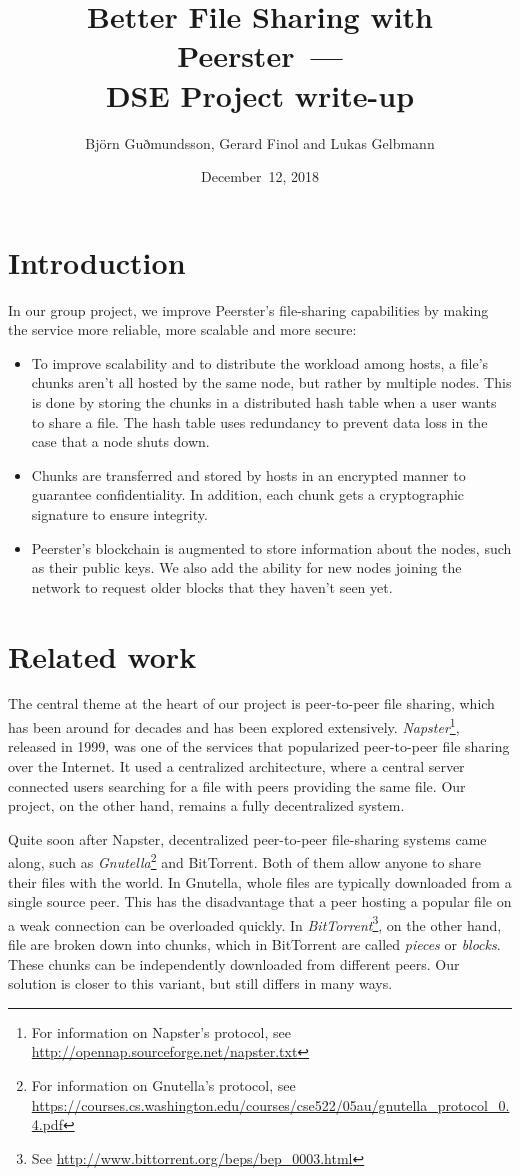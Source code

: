 \documentclass[12pt,a4paper,draft]{article}
\title{Better File Sharing with Peerster~---\\DSE Project write-up}
\author{Björn Guðmundsson, Gerard Finol and Lukas Gelbmann}
\date{December~12, 2018}
\begin{document}
\maketitle
\tableofcontents

\section{Introduction}

In our group project, we improve Peerster's file-sharing capabilities by making the service more reliable, more scalable and more secure:

\begin{itemize}
    \item To improve scalability and to distribute the workload among hosts, a file's chunks aren't all hosted by the same node, but rather by multiple nodes.
    This is done by storing the chunks in a distributed hash table when a user wants to share a file.
    The hash table uses redundancy to prevent data loss in the case that a node shuts down.
    \item Chunks are transferred and stored by hosts in an encrypted manner to guarantee confidentiality.
    In addition, each chunk gets a cryptographic signature to ensure integrity.
    \item Peerster's blockchain is augmented to store information about the nodes, such as their public keys.
    We also add the ability for new nodes joining the network to request older blocks that they haven't seen yet.
\end{itemize}

\section{Related work}

The central theme at the heart of our project is peer-to-peer file sharing, which has been around for decades and has been explored extensively.
\emph{Napster}\footnote{For information on Napster's protocol, see \url{http://opennap.sourceforge.net/napster.txt}}, released in 1999, was one of the services that popularized peer-to-peer file sharing over the Internet.
It used a centralized architecture, where a central server connected users searching for a file with peers providing the same file.
Our project, on the other hand, remains a fully decentralized system.

Quite soon after Napster, decentralized peer-to-peer file-sharing systems came along, such as \emph{Gnutella}\footnote{For information on Gnutella's protocol, see \url{https://courses.cs.washington.edu/courses/cse522/05au/gnutella\_protocol\_0.4.pdf}} and BitTorrent.
Both of them allow anyone to share their files with the world.
In Gnutella, whole files are typically downloaded from a single source peer.
This has the disadvantage that a peer hosting a popular file on a weak connection can be overloaded quickly.
In \emph{BitTorrent}\footnote{See \url{http://www.bittorrent.org/beps/bep_0003.html}}, on the other hand, file are broken down into chunks, which in BitTorrent are called \emph{pieces} or \emph{blocks}.
These chunks can be independently downloaded from different peers.
Our solution is closer to this variant, but still differs in many ways.
\end{document}
